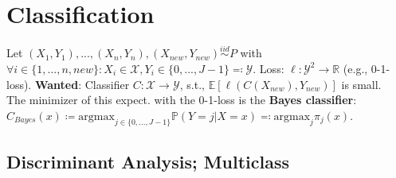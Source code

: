 \section{Classification}
Let $(X_1, Y_1),...,(X_n, Y_n), (X_{new}, Y_{new}) \overset{iid}{\sim} P$ with $\forall i \in \{1,...,n, {new}\}: X_i \in \mathcal{X}, Y_i \in \{0,...,J-1\} \eqqcolon \mathcal{Y}$. Loss: $\ell: \mathcal{Y}^2 \to \mathbb{R}$ (e.g., 0-1-loss). \textbf{Wanted}: Classifier $C: \mathcal{X} \to \mathcal{Y}$, s.t., $\mathbb{E}[\ell(C(X_{new}), Y_{new})]$ is small. \\
The minimizer of this expect. with the 0-1-loss is the \textbf{Bayes classifier}: $C_{Bayes}(x) \coloneqq {\text{argmax}}_{j\in \{0,...,J-1\}}\mathbb{P}(Y=j|X=x) \eqqcolon {\text{argmax}}_{j} \pi_j(x)$.
\subsection*{Discriminant Analysis; Multiclass}

